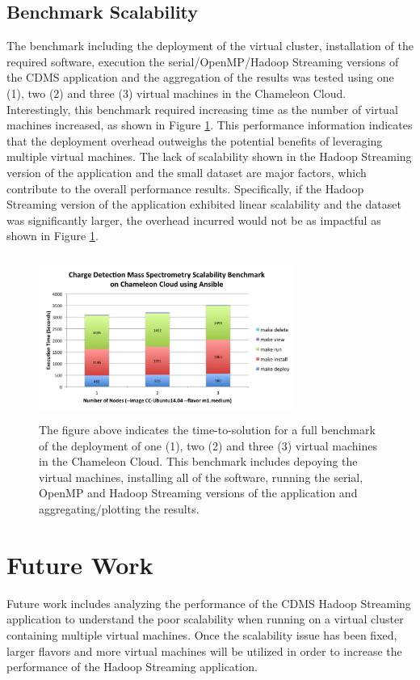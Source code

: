 \documentclass[9pt,twocolumn,twoside]{../../styles/osajnl}
\begin{document}
\subsection{Benchmark Scalability} \label{benchmark-performance}
The benchmark including the deployment of the virtual cluster,
installation of the required software, execution the
serial/OpenMP/Hadoop Streaming versions of the CDMS application and
the aggregation of the results was tested using one (1), two (2) and
three (3) virtual machines in the Chameleon Cloud. Interestingly, this
benchmark required increasing time as the number of virtual machines
increased, as shown in Figure \ref{fig:benchmark}. This performance
information indicates that the deployment overhead outweighs the
potential benefits of leveraging multiple virtual machines. The lack
of scalability shown in the Hadoop Streaming version of the
application and the small dataset are major factors, which contribute
to the overall performance results. Specifically, if the Hadoop
Streaming version of the application exhibited linear scalability and
the dataset was significantly larger, the overhead incurred would not
be as impactful as shown in Figure \ref{fig:benchmark}.

\begin{figure}[h]
\centering
\includegraphics[height=2.1in, width=3.3in]{images/benchmark}
\caption{The figure above indicates the time-to-solution for a full
  benchmark of the deployment of one (1), two (2) and three (3)
  virtual machines in the Chameleon Cloud. This benchmark includes
  depoying the virtual machines, installing all of the software,
  running the serial, OpenMP and Hadoop Streaming versions of the
  application and aggregating/plotting the results.}
\label{fig:benchmark}
\end{figure}


\section{Future Work} \label{future}
Future work includes analyzing the performance of the CDMS Hadoop
Streaming application to understand the poor scalability when running
on a virtual cluster containing multiple virtual machines. Once the
scalability issue has been fixed, larger flavors and more virtual
machines will be utilized in order to increase the performance of the
Hadoop Streaming application.
\end{document}
